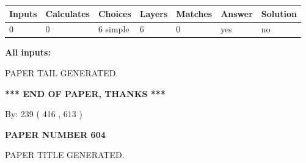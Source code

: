 \documentclass{ctexart}
\begin{document}
 
   
   
   
   
\noindent\begin{tabular}{|l|l|l|l|l|l|l|}
 \hline
Inputs & Calculates & Choices & Layers & Matches & Answer & Solution \\ \hline
 0  & 
 0  & 
 6
  simple  
  & 
 6  & 
 0  & 
  yes & 
  no 
  \\ \hline
 \end{tabular}
   
   
   
   
\noindent{}
   
   
   
   
\noindent\vspace{0.1in}\hspace{-0.08in} {\textbf{\Large{All inputs: }}}
   
   
   
   
   
   
 \vspace{0.2in}
 
   
   
\vspace{2.0in} PAPER TAIL GENERATED.
   
   
   
   
\vspace{1.0in} 
{\textbf{\large{ *** END OF PAPER, THANKS *** }}} 
   
   
\hspace{1.0in} By: 
 239 ( 416 ,  613 )
   
   
   
   
\newpage 
\setcounter{page}{ 
   604001 } 
   
   
   
   
 {\textbf{ \Large{ PAPER NUMBER  604  }}}
   
   
\vspace{0.2in}
   
   
   
   
   
   
   
   
 \vspace{0.2in}
 
 
 
 
   
   
 PAPER TITLE GENERATED.
   
\end{document}
